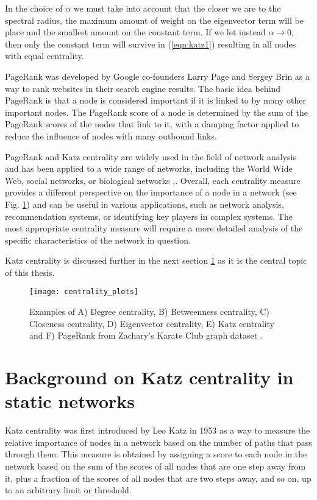 In the choice of $\alpha$ we must take into account that the closer we are to the spectral radius, the maximum amount of weight on the eigenvector term will be place and the smallest amount on the constant term. If we let instead $\alpha\to 0$, then only the constant term will survive in (\ref{eqn:katz1}) resulting in all nodes with equal centrality.

PageRank was developed by Google co-founders Larry Page and Sergey Brin as a way to rank websites in their search engine results. The basic idea behind PageRank is that a node is considered important if it is linked to by many other important nodes. The PageRank score of a node is determined by the sum of the PageRank scores of the nodes that link to it, with a damping factor applied to reduce the influence of nodes with many outbound links. 

PageRank and Katz centrality are widely used in the field of network analysis and has been applied to a wide range of networks, including the World Wide Web, social networks, or biological networks \cite{brin1998anatomy,jeong2001lethality},\cite[Ch.\ 5]{wasserman1994social}. Overall, each centrality measure provides a different perspective on the importance of a node in a network (see Fig. \ref{centrality}) and can be useful in various applications, such as network analysis, recommendation systems, or identifying key players in complex systems. The most appropriate centrality measure will require a more detailed analysis of the specific characteristics of the network in question.

Katz centrality is discussed further in the next section \ref{sec:back} as it is the central topic of this thesis.

\begin{figure}[h]\centering
	\texttt{[image: centrality\_plots]}
	\caption{Examples of A) Degree centrality, B) Betweenness centrality, C) Closeness centrality, D) Eigenvector centrality, E) Katz centrality and F) PageRank from Zachary’s Karate Club graph dataset \cite{zachary1977information}.}
	\label{centrality}
	\bigskip
\end{figure}

\section{Background on Katz centrality in static networks}
\label{sec:back}

Katz centrality was first introduced by Leo Katz \cite{katz1953new} in 1953 as a way to measure the relative importance of nodes in a network based on the number of paths that pass through them. This measure is obtained by assigning a score to each node in the network based on the sum of the scores of all nodes that are one step away from it, plus a fraction of the scores of all nodes that are two steps away, and so on, up to an arbitrary limit or threshold.

